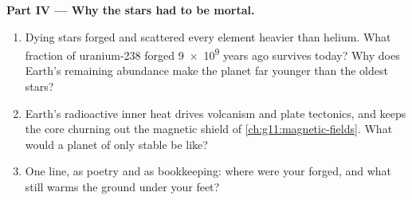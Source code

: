 \begin{problem}
\medskip
\noindent\textbf{Part IV --- Why the stars had to be mortal.}
\begin{enumerate}[resume]
  \item Dying stars forged and scattered every element heavier than
        helium. What fraction of uranium-238 forged \num{9e9} years ago
        survives today? Why does Earth's remaining abundance make the
        planet far younger than the oldest stars?
  \item Earth's radioactive inner heat drives volcanism and plate
        tectonics, and keeps the core churning out the magnetic shield of
        \cref{ch:g11:magnetic-fields}. What would a planet of only stable
         be like?
  \item One line, as poetry and as bookkeeping: where were your 
        forged, and what still warms the ground under your feet?
\end{enumerate}
\end{problem}
